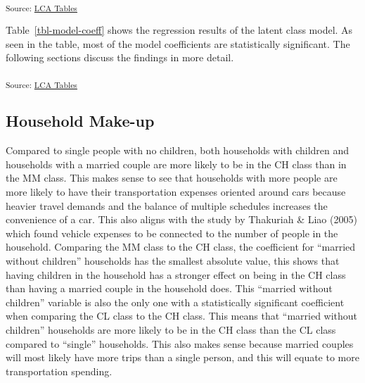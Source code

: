 \documentclass[
]{agujournal2019}
\begin{document}
\begin{table}

\caption{\label{tbl-model-classes}Class Distribution of Model}

\centering{

}

\end{table}%

\textsubscript{Source:
\href{https://KamrynMansfield.github.io/transpo_budget_ces/notebooks/LCA-preview.html\#cell-tbl-model-classes}{LCA
Tables}}

Table~\ref{tbl-model-coeff} shows the regression results of the latent
class model. As seen in the table, most of the model coefficients are
statistically significant. The following sections discuss the findings
in more detail.

\begin{table}

\caption{\label{tbl-model-coeff}Regression Results of Model}

\centering{

}

\end{table}%

\textsubscript{Source:
\href{https://KamrynMansfield.github.io/transpo_budget_ces/notebooks/LCA-preview.html\#cell-tbl-model-coeff}{LCA
Tables}}

\subsection{Household Make-up}\label{household-make-up}

Compared to single people with no children, both households with
children and households with a married couple are more likely to be in
the CH class than in the MM class. This makes sense to see that
households with more people are more likely to have their transportation
expenses oriented around cars because heavier travel demands and the
balance of multiple schedules increases the convenience of a car. This
also aligns with the study by Thakuriah \& Liao (2005) which found
vehicle expenses to be connected to the number of people in the
household. Comparing the MM class to the CH class, the coefficient for
``married without children'' households has the smallest absolute value,
this shows that having children in the household has a stronger effect
on being in the CH class than having a married couple in the household
does. This ``married without children'' variable is also the only one
with a statistically significant coefficient when comparing the CL class
to the CH class. This means that ``married without children'' households
are more likely to be in the CH class than the CL class compared to
``single'' households. This also makes sense because married couples
will most likely have more trips than a single person, and this will
equate to more transportation spending.
\end{document}
